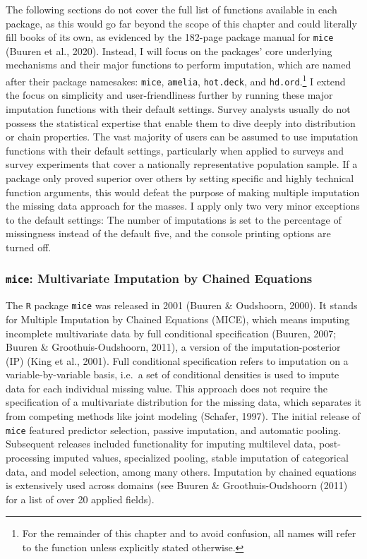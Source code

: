 \documentclass[12pt,econ]{sources/authesis}
\begin{document}
The following sections do not cover the full list of functions available in each package, as this would go far beyond the scope of this chapter and could literally fill books of its own, as evidenced by the 182-page package manual for \texttt{mice} (Buuren et al., 2020). Instead, I will focus on the packages' core underlying mechanisms and their major functions to perform imputation, which are named after their package namesakes: \texttt{mice}, \texttt{amelia}, \texttt{hot.deck}, and \texttt{hd.ord}.\footnote{For the remainder of this chapter and to avoid confusion, all names will refer to the function unless explicitly stated otherwise.} I extend the focus on simplicity and user-friendliness further by running these major imputation functions with their default settings. Survey analysts usually do not possess the statistical expertise that enable them to dive deeply into distribution or chain properties. The vast majority of users can be assumed to use imputation functions with their default settings, particularly when applied to surveys and survey experiments that cover a nationally representative population sample. If a package only proved superior over others by setting specific and highly technical function arguments, this would defeat the purpose of making multiple imputation the missing data approach for the masses. I apply only two very minor exceptions to the default settings: The number of imputations is set to the percentage of missingness instead of the default five, and the console printing options are turned off.

\hypertarget{ordmiss-theory-multimpute-mice}{%
\subsubsection{\texorpdfstring{\texttt{mice}: Multivariate Imputation by Chained Equations}{mice: Multivariate Imputation by Chained Equations}}\label{ordmiss-theory-multimpute-mice}}

The \texttt{R} package \texttt{mice} was released in 2001 (Buuren \& Oudshoorn, 2000). It stands for Multiple Imputation by Chained Equations (MICE), which means imputing incomplete multivariate data by full conditional specification (Buuren, 2007; Buuren \& Groothuis-Oudshoorn, 2011), a version of the imputation-posterior (IP) (King et al., 2001). Full conditional specification refers to imputation on a variable-by-variable basis, i.e.~a set of conditional densities is used to impute data for each individual missing value. This approach does not require the specification of a multivariate distribution for the missing data, which separates it from competing methods like joint modeling (Schafer, 1997). The initial release of \texttt{mice} featured predictor selection, passive imputation, and automatic pooling. Subsequent releases included functionality for imputing multilevel data, post-processing imputed values, specialized pooling, stable imputation of categorical data, and model selection, among many others. Imputation by chained equations is extensively used across domains (see Buuren \& Groothuis-Oudshoorn (2011) for a list of over 20 applied fields).
\end{document}
